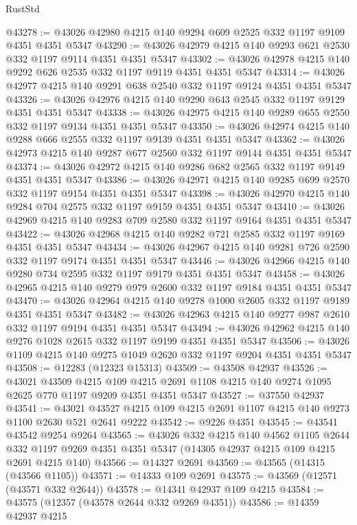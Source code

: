 \begin{lexlean}{RustStd}
\begin{coremodule}
@43278 := @43026 @42980 @4215 @140 @9294 @609 @2525 @332 @1197 @9109 @4351 @4351 @5347
@43290 := @43026 @42979 @4215 @140 @9293 @621 @2530 @332 @1197 @9114 @4351 @4351 @5347
@43302 := @43026 @42978 @4215 @140 @9292 @626 @2535 @332 @1197 @9119 @4351 @4351 @5347
@43314 := @43026 @42977 @4215 @140 @9291 @638 @2540 @332 @1197 @9124 @4351 @4351 @5347
@43326 := @43026 @42976 @4215 @140 @9290 @643 @2545 @332 @1197 @9129 @4351 @4351 @5347
@43338 := @43026 @42975 @4215 @140 @9289 @655 @2550 @332 @1197 @9134 @4351 @4351 @5347
@43350 := @43026 @42974 @4215 @140 @9288 @666 @2555 @332 @1197 @9139 @4351 @4351 @5347
@43362 := @43026 @42973 @4215 @140 @9287 @677 @2560 @332 @1197 @9144 @4351 @4351 @5347
@43374 := @43026 @42972 @4215 @140 @9286 @682 @2565 @332 @1197 @9149 @4351 @4351 @5347
@43386 := @43026 @42971 @4215 @140 @9285 @699 @2570 @332 @1197 @9154 @4351 @4351 @5347
@43398 := @43026 @42970 @4215 @140 @9284 @704 @2575 @332 @1197 @9159 @4351 @4351 @5347
@43410 := @43026 @42969 @4215 @140 @9283 @709 @2580 @332 @1197 @9164 @4351 @4351 @5347
@43422 := @43026 @42968 @4215 @140 @9282 @721 @2585 @332 @1197 @9169 @4351 @4351 @5347
@43434 := @43026 @42967 @4215 @140 @9281 @726 @2590 @332 @1197 @9174 @4351 @4351 @5347
@43446 := @43026 @42966 @4215 @140 @9280 @734 @2595 @332 @1197 @9179 @4351 @4351 @5347
@43458 := @43026 @42965 @4215 @140 @9279 @979 @2600 @332 @1197 @9184 @4351 @4351 @5347
@43470 := @43026 @42964 @4215 @140 @9278 @1000 @2605 @332 @1197 @9189 @4351 @4351 @5347
@43482 := @43026 @42963 @4215 @140 @9277 @987 @2610 @332 @1197 @9194 @4351 @4351 @5347
@43494 := @43026 @42962 @4215 @140 @9276 @1028 @2615 @332 @1197 @9199 @4351 @4351 @5347
@43506 := @43026 @1109 @4215 @140 @9275 @1049 @2620 @332 @1197 @9204 @4351 @4351 @5347
@43508 := @12283 (@12323 @15313)
@43509 := @43508 @42937
@43526 := @43021
    @43509
    @4215
    @109
    @4215
    @2691
    @1108
    @4215
    @140
    @9274
    @1095
    @2625
    @770
    @1197
    @9209
    @4351
    @4351
    @5347
@43527 := @37550 @42937
@43541 := @43021 @43527 @4215 @109 @4215 @2691 @1107 @4215 @140 @9273 @1100 @2630 @521 @2641 @9222
@43542 := @9226 @4351
@43545 := @43541 @43542 @9254 @9264
@43565 := @43026
    @332
    @4215
    @140
    @4562
    @1105
    @2644
    @332
    @1197
    @9269
    @4351
    @4351
    @5347
    (@14305 @42937 @4215 @109 @4215 @2691 @4215 @140)
@43566 := @14327 @2691
@43569 := @43565 (@14315 (@43566 @1105))
@43571 := @14333 @109 @2691
@43575 := @43569 (@12571 (@43571 @332 @2644))
@43578 := @14341 @42937 @109 @4215
@43584 := @43575 (@12357 (@43578 @2644 @332 @9269 @4351))
@43586 := @14359 @42937 @4215

\end{coremodule}
\end{lexlean}
